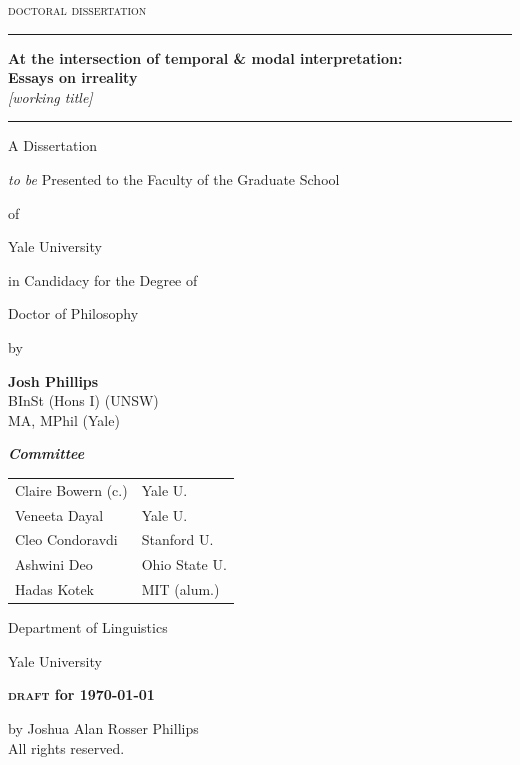 \documentclass[12pt,dvipsnames]{report}
\date{}
\newcommand{\HRule}{\rule{\linewidth}{0.5mm}}
\begin{document}
%
	
\begin{center}
	\thispagestyle{empty}
	{\Large	\textsc{doctoral dissertation}}
	\vfill
	\HRule\vspace{.33cm}
	
	\setcounter{page}{-1}
	\textbf{{\huge At the intersection of temporal \& modal interpretation:}\\
		{\Large Essays on irreality}}\\\textit{[working title]}
	
	\HRule
	\vfill
	\normalsize	A Dissertation
	
	\textit{to be }Presented to the Faculty of the Graduate School%
	
	of
	
	Yale University
	
	in Candidacy for the Degree of 
	
	Doctor of Philosophy
	\vfill
	{\small by
		
		\textbf{Josh Phillips}\\\footnotesize BInSt (Hons I\textasteriskcentered)  (UNSW)\\MA, MPhil (Yale)}
	\vfill
	\textit{\textbf{Committee}}\\
	\begin{tabular}{ll}
		Claire Bowern (c.) & Yale U.\\
		Veneeta Dayal & Yale U.\\
		Cleo Condoravdi & Stanford U.\\
		Ashwini Deo & Ohio State U.\\
		Hadas Kotek & MIT  (alum.)\\
	\end{tabular}
	
	
	
	\vfill
	\sc Department of Linguistics
	
	Yale University
	
	\textbf{\textsc{draft} for \today}
	
	
\end{center}
\pagebreak{}
\hspace{0pt}
\vspace*{3in}
\begin{center}
	 by Joshua Alan Rosser Phillips\\
	
	All rights reserved.
\end{center}
\vfill
\hspace{0pt}
\pagebreak
\end{document}
